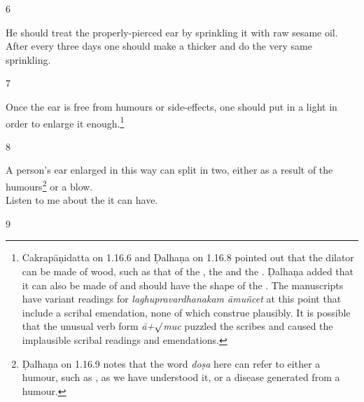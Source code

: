 \begin{translation}
\item[6] 
    
He should treat the properly-pierced ear by sprinkling it with raw sesame
oil.   After every three days one should make a thicker  and
do the very same sprinkling.
    
\item[7] 
    
Once the ear is free from humours or side-effects, one should put in a light
 in order to enlarge it enough.\footnote{Cakrapāṇidatta
    on 1.16.6 \citep[127]{acar-1939} and Ḍalhaṇa on 1.16.8 \citep[77]{vulgate} pointed
    out that the dilator can be made of wood, such as that of the
    , the  and the
    . Ḍalhaṇa added that it can also be made of
     and should have the shape of the . The manuscripts have variant readings for \emph{laghupravardhanakam 
    āmuñcet} at this point that include a scribal
    emendation, none of which construe plausibly. It is possible that the unusual
    verb form \emph{ā+$\surd$muc} puzzled the scribes and caused 
    the implausible scribal readings and emendations.} 
    
\item[8]
    
\begin{sloka}
A person's ear enlarged in this way can split in two, either as a result of the 
humours\footnote{Ḍalhaṇa on 1.16.9  \citep[77]{vulgate} notes that the word \emph{doṣa} 
here can refer to either a humour, such as , as we have understood it, or a 
disease generated from a humour.} or a blow.\\ Listen to me about the 
it can have. 
    \end{sloka}
    
\item[9]
    

\end{translation}
